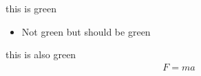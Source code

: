 \documentclass{beamer}
\begin{document}
{
\begin{frame}
    this is green
    \begin{itemize}
        \item Not green but should be green
    \end{itemize}
    this is also green
    \begin{align*}
        F = ma
    \end{align*}
\end{frame}
}
\end{document}
